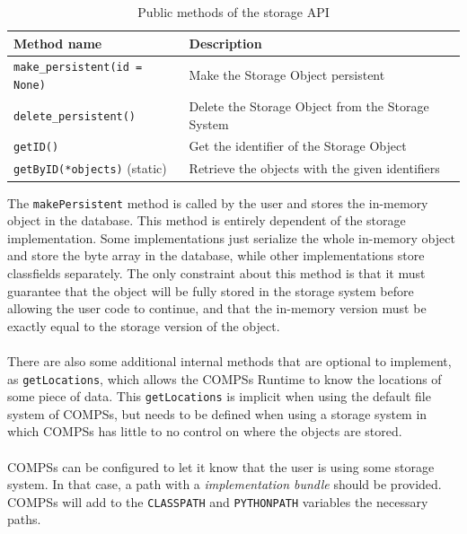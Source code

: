 \begin{table}[]
\centering
\begin{tabular}{|l|l|}
\hline
Method name                                                     & Description                                                        \\ \hline
\verb|make_persistent(id = None)| & Make the Storage Object persistent                                 \\ \hline
\verb|delete_persistent()|        & Delete the Storage Object from the Storage System                  \\ \hline
\verb|getID()|                     & Get the identifier of the Storage Object                           \\ \hline
\verb|getByID(*objects)| (static)  & Retrieve the objects with the given identifiers \\ \hline
\end{tabular}
\caption{Public methods of the storage API}
\label{table:storage_api_public_methods}
\end{table}
The \verb|makePersistent| method is called by the user and stores the in-memory object in the database. This method is entirely dependent of the storage implementation. Some implementations just serialize the whole in-memory object and store the byte array in the database, while other implementations store classfields separately. The only constraint about this method is that it must guarantee that the object will be fully stored in the storage system before allowing the user code to continue, and that the in-memory version must be exactly equal to the storage version of the object.\\
\\
There are also some additional internal methods that are optional to implement, as \verb|getLocations|, which allows the COMPSs Runtime to know the locations of some piece of data. This \verb|getLocations| is implicit when using the default file system of COMPSs, but needs to be defined when using a storage system in which COMPSs has little to no control on where the objects are stored.\\
\\
COMPSs can be configured to let it know that the user is using some storage system. In that case, a path with a \textit{implementation bundle} should be provided. COMPSs will add to the \verb|CLASSPATH| and \verb|PYTHONPATH| variables the necessary paths.\\
\\
